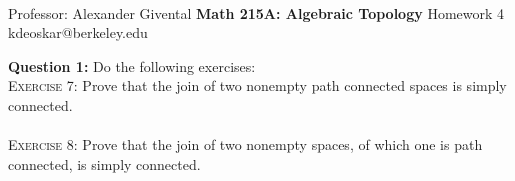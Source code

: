 \documentclass[11pt]{article}
\begin{document}
\thispagestyle{empty}
\bigskip \
\vspace{0.1cm}

\begin{center}
{\fontsize{22}{22} \selectfont Professor: Alexander Givental}
\vskip 16pt
{\fontsize{30}{30} \selectfont \bf \sffamily Math 215A: Algebraic Topology}
\vskip 24pt
{\fontsize{14}{14} \selectfont \rmfamily Homework 4} 
\vskip 6pt
{\fontsize{14}{14} \selectfont \ttfamily kdeoskar@berkeley.edu} 
\vskip 24pt
\end{center}



\begin{bluebox}
  \textbf{Question 1:} Do the following exercises: 
  \\
  \textsc{Exercise 7:} Prove that the join of two nonempty path connected spaces is simply connected.
  \\
  \\
  \textsc{Exercise 8:} Prove that the join of two nonempty spaces, of which one is path connected, is simply connected. 
\end{bluebox}
\end{document}
